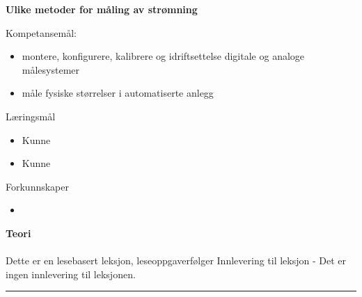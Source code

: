 \centerline{\bf Ulike metoder for måling av strømning}  \bigskip

Kompetansemål:
\begin{itemize}[noitemsep]

	\item montere, konfigurere, kalibrere og idriftsettelse digitale og analoge målesystemer
	\item måle fysiske størrelser i automatiserte anlegg
\end{itemize}
	Læringsmål
	\begin{itemize}[noitemsep]
		\item Kunne 
		\item Kunne 
	\end{itemize}

	Forkunnskaper

	\begin{itemize}[noitemsep]
		\item 

	\end{itemize}
\textbf{Teori}\\\\
Dette er en lesebasert leksjon, leseoppgaverfølger
Innlevering til leksjon - Det er ingen innlevering til leksjonen. 
\bigskip 
\hrule
\vfil \eject
